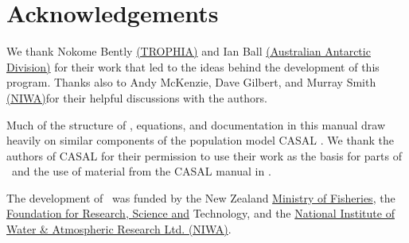 \section{Acknowledgements\label{sec:acknowledgements}}

We thank Nokome Bently \href{http://www.trophia.co.nz/}{(TROPHIA)} and Ian Ball \href{http://www.aad.gov.au/}{(Australian Antarctic Division)} for their work that led to the ideas behind the development of this program. Thanks also to Andy McKenzie, Dave Gilbert, and Murray Smith \href{http://www.niwa.co.nz}{(NIWA)}for their helpful discussions with the authors. 

Much of the structure of \SPM, equations, and documentation in this manual draw heavily on similar components of the population model CASAL \citep{1388}. We thank the authors of CASAL for their permission to use their work as the basis for parts of \SPM\ and the use of material from the CASAL manual in \SPM.

The development of \SPM\ was funded by the New Zealand \href{http://www.fish.govt.nz}{Ministry of Fisheries}, the \href{http://www.frst.govt.nz/}{Foundation for Research, Science and} Technology, and the \href{http://www.niwa.co.nz}{National Institute of Water \& Atmospheric Research Ltd. (NIWA)}. 
